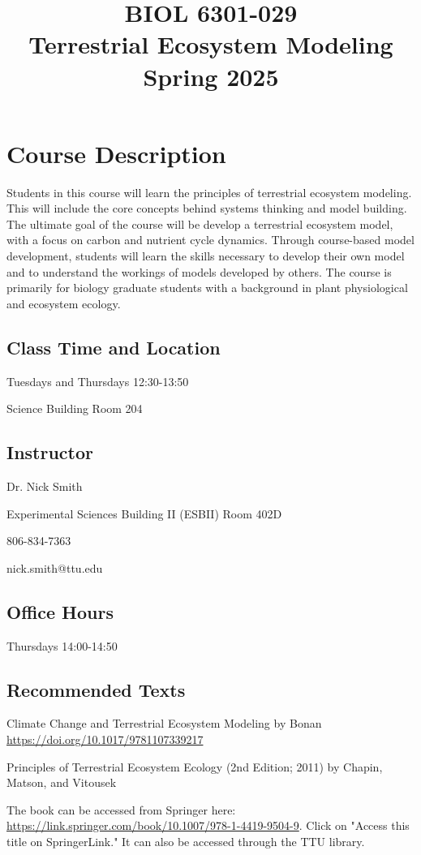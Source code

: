 \documentclass[12pt, notitlepage]{article}   	%
\title{
	\textbf{
		BIOL 6301-029
	} \\
	\large Terrestrial Ecosystem Modeling \\
	\large Spring 2025
}
\date{\vspace{-5ex}}
\begin{document}
{\selectfont %

\maketitle

\section{Course Description}
Students in this course will learn the principles of terrestrial ecosystem modeling.
This will include the core concepts behind systems thinking and model building.
The ultimate goal of the course will be develop a terrestrial ecosystem model, with
a focus on carbon and nutrient cycle dynamics. Through course-based model development,
students will learn the skills necessary to develop their own model and to understand
the workings of models developed by others. The course is primarily for biology
graduate students with a background in plant physiological and ecosystem ecology.

\subsection{Class Time and Location}
Tuesdays and Thursdays 12:30-13:50

Science Building Room 204

\subsection{Instructor}
Dr. Nick Smith \par
Experimental Sciences Building II (ESBII) Room 402D \par
806-834-7363 \par
nick.smith@ttu.edu \par

\subsection{Office Hours}
Thursdays 14:00-14:50

\subsection{Recommended Texts}
Climate Change and Terrestrial Ecosystem Modeling
by Bonan
\url{https://doi.org/10.1017/9781107339217}\par

Principles of Terrestrial Ecosystem Ecology (2nd Edition; 2011) 
by Chapin, Matson, and Vitousek \par
The book can be accessed from Springer here: 
\url{https://link.springer.com/book/10.1007/978-1-4419-9504-9}. Click on "Access this title on 
SpringerLink." It can also be accessed through the TTU library.

}
\end{document}
